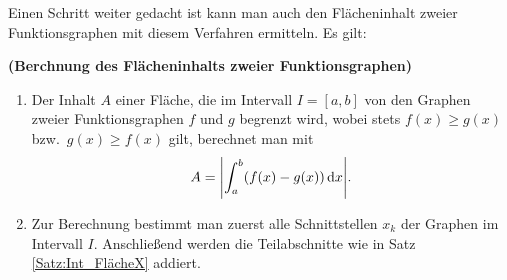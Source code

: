 \documentclass[ngerman, 12pt]{nssheetxea}
\begin{document}
Einen Schritt weiter gedacht ist kann man auch den Flächeninhalt zweier Funktionsgraphen mit diesem Verfahren ermitteln. Es gilt:

\begin{theorem} \textbf{(Berchnung des Flächeninhalts zweier Funktionsgraphen)}
\begin{enumerate}
\item Der Inhalt $A$ einer Fläche, die im Intervall $I=[a,b]$ von den Graphen zweier Funktionsgraphen $f$ und $g$ begrenzt wird, wobei stets $f(x)\geq g(x)$ bzw.\ $g(x)\geq f(x)$ gilt, berechnet man mit
\[ A= \mleft| \int_a^b (f(x)-g(x))\diff x   \mright|. \]
\item Zur Berechnung bestimmt man zuerst alle Schnittstellen $x_k$ der Graphen im Intervall $I$. Anschließend werden die Teilabschnitte wie in Satz \ref{Satz:Int_FlächeX} addiert.
\end{enumerate}
\end{theorem}
\end{document}
